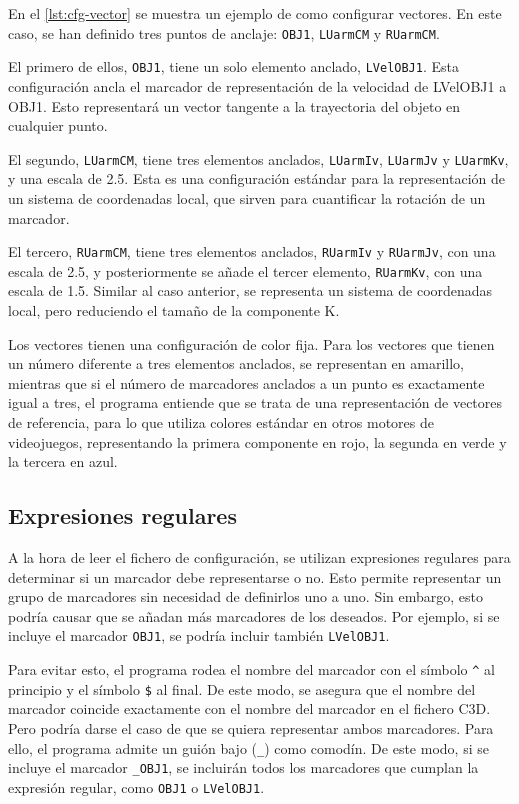 En el \autoref{lst:cfg-vector} se muestra un ejemplo de como configurar vectores. En este caso, se han definido tres puntos de anclaje: \texttt{OBJ1}, \texttt{LUarmCM} y \texttt{RUarmCM}. 

El primero de ellos, \texttt{OBJ1}, tiene un solo elemento anclado, \texttt{LVelOBJ1}. Esta configuración ancla el marcador de representación de la velocidad de LVelOBJ1 a OBJ1. Esto representará un vector tangente a la trayectoria del objeto en cualquier punto.

El segundo, \texttt{LUarmCM}, tiene tres elementos anclados, \texttt{LUarmIv}, \texttt{LUarmJv} y \texttt{LUarmKv}, y una escala de 2.5. Esta es una configuración estándar para la representación de un sistema de coordenadas local, que sirven para cuantificar la rotación de un marcador.

El tercero, \texttt{RUarmCM}, tiene tres elementos anclados, \texttt{RUarmIv} y \texttt{RUarmJv}, con una escala de 2.5, y posteriormente se añade el tercer elemento, \texttt{RUarmKv}, con una escala de 1.5. Similar al caso anterior, se representa un sistema de coordenadas local, pero reduciendo el tamaño de la componente K.

Los vectores tienen una configuración de color fija. Para los vectores que tienen un número diferente a tres elementos anclados, se representan en amarillo, mientras que si el número de marcadores anclados a un punto es exactamente igual a tres, el programa entiende que se trata de una representación de vectores de referencia, para lo que utiliza colores estándar en otros motores de videojuegos, representando la primera componente en rojo, la segunda en verde y la tercera en azul. 

\subsection{Expresiones regulares}

A la hora de leer el fichero de configuración, se utilizan expresiones regulares para determinar si un marcador debe representarse o no. Esto permite representar un grupo de marcadores sin necesidad de definirlos uno a uno. Sin embargo, esto podría causar que se añadan más marcadores de los deseados. Por ejemplo, si se incluye el marcador \texttt{OBJ1}, se podría incluir también \texttt{LVelOBJ1}. 

Para evitar esto, el programa rodea el nombre del marcador con el símbolo \texttt{\^} al principio y el símbolo \texttt{\$} al final. De este modo, se asegura que el nombre del marcador coincide exactamente con el nombre del marcador en el fichero \ac{C3D}. Pero podría darse el caso de que se quiera representar ambos marcadores. Para ello, el programa admite un guión bajo (\texttt{\_}) como comodín. De este modo, si se incluye el marcador \texttt{\_OBJ1}, se incluirán todos los marcadores que cumplan la expresión regular, como \texttt{OBJ1} o \texttt{LVelOBJ1}. 

